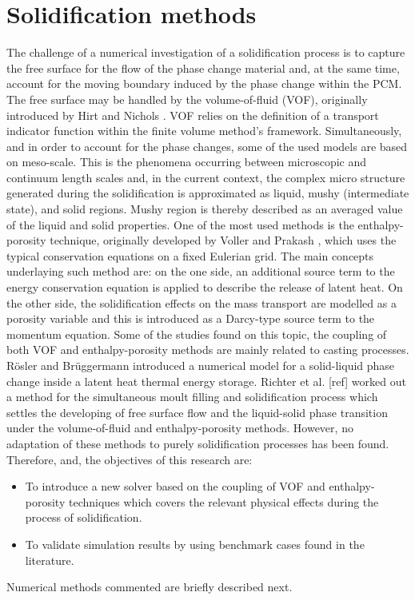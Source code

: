 \section{Solidification methods}
The challenge of a numerical investigation of a solidification process is to capture the free surface for the flow of the phase change material and, at the same time, account for the moving boundary induced by the phase change within the PCM. The free surface may be handled by the volume-of-fluid (VOF), originally introduced by Hirt and Nichols  \cite{hirt_nichols_1981}. VOF relies on the definition of a transport indicator function within the finite volume method's framework.
Simultaneously, and in order to account for the phase changes, some of the used models are based on meso-scale. This is the phenomena occurring between microscopic and continuum length scales and, in the current context, the complex micro structure generated during the solidification is approximated as liquid, mushy (intermediate state), and solid regions. Mushy region is thereby described as an averaged value of the liquid and solid properties.
\newline
\indent One of the most used methods is the enthalpy-porosity technique, originally developed by Voller and Prakash \cite{voller_prakash_1987}, which uses the typical conservation equations on a fixed Eulerian grid. The main concepts underlaying such method are: on the one side, an additional source term to the energy conservation equation is applied to describe the release of latent heat. On the other side, the solidification effects on the mass transport are modelled as a porosity variable and this is introduced as a Darcy-type source term to the momentum equation.
\newline
\indent Some of the studies found on this topic, the coupling of both VOF and enthalpy-porosity methods are mainly related to casting processes. Rösler and Brüggermann \cite{rösler_brüggemann_2011} introduced a numerical model for a solid-liquid phase change inside a latent heat thermal energy storage. Richter et al. [ref] worked out a method for the simultaneous moult filling and solidification process which settles the developing of free surface flow and the liquid-solid phase transition under the volume-of-fluid and enthalpy-porosity methods.
However, no adaptation of these methods to purely solidification processes has been found. Therefore, and, the objectives of this research are:
\begin{itemize}
	\item To introduce a new solver based on the coupling of VOF and enthalpy-porosity techniques which covers the relevant physical effects during the process of solidification.
	\item	To validate simulation results by using benchmark cases found in the literature.
\end{itemize}
Numerical methods commented are briefly described next.


